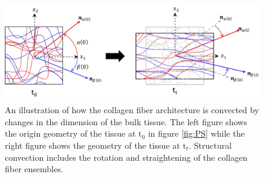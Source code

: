 \begin{figure}[hbt]
\centering
\includegraphics[width=\textwidth]{Images/chapter4/figure4}
\caption{An illustration of how the collagen fiber architecture is convected by changes in the dimension of the bulk tissue. The left figure shows the origin geometry of the tissue at $\mathrm{t}_0$ in figure \ref{fig:PS} while the right figure shows the geometry of the tissue at $\mathrm{t}_t$. Structural convection includes the rotation and straightening of the collagen fiber ensembles. }
\label{fig:structuralconvection}
\end{figure}


